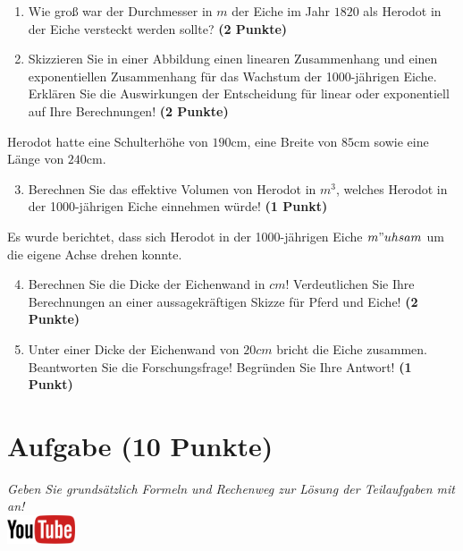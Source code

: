 \documentclass[a4paper, 9pt]{scrartcl}\usepackage[]{graphicx}\usepackage[]{xcolor}
\begin{document}
\begin{enumerate}
\item Wie gro{\ss} war der Durchmesser in $m$ der Eiche im Jahr $1820$ als
  Herodot in der Eiche versteckt werden sollte?
  \textbf{(2 Punkte)}
\item Skizzieren Sie in einer Abbildung einen linearen Zusammenhang und einen
exponentiellen Zusammenhang f{\"u}r das Wachstum der 1000-j{\"a}hrigen Eiche. Erkl{\"a}ren Sie die
Auswirkungen der Entscheidung f{\"u}r linear oder exponentiell auf Ihre
Berechnungen! \textbf{(2 Punkte)}
\end{enumerate}
 
Herodot hatte eine Schulterh{\"o}he von $190$cm, eine Breite von
$85$cm sowie eine L{\"a}nge von  $240$cm.

\begin{enumerate}
  \setcounter{enumi}{2}
\item Berechnen Sie das effektive Volumen von Herodot in $m^3$, welches
  Herodot in der 1000-j{\"a}hrigen Eiche einnehmen w{\"u}rde! \textbf{(1 Punkt)}
\end{enumerate}

Es wurde berichtet, dass sich Herodot in der 1000-j{\"a}hrigen Eiche
$m{"u}hsam$ um die eigene Achse drehen konnte.

\begin{enumerate}
  \setcounter{enumi}{3}
\item Berechnen Sie die Dicke der Eichenwand in $cm$! Verdeutlichen Sie Ihre
  Berechnungen an einer aussagekr{\"a}ftigen Skizze f{\"u}r Pferd und Eiche! \textbf{(2 Punkte)} 
\item Unter einer Dicke der Eichenwand von $20cm$ bricht
  die Eiche zusammen. Beantworten Sie die Forschungsfrage! Begr{\"u}nden Sie
  Ihre Antwort! \textbf{(1 Punkt)} 
\end{enumerate}
 
\clearpage

\section{Aufgabe \hfill (10 Punkte)}

\textit{Geben Sie grunds{\"a}tzlich Formeln und Rechenweg zur L{\"o}sung der
  Teilaufgaben mit an!} \\[1Ex]

\hfill\href{https://youtu.be/57B-yYoFSk0}{\includegraphics[width =
  2cm]{img/youtube}} %
\hspace{2Ex}
\end{document}
